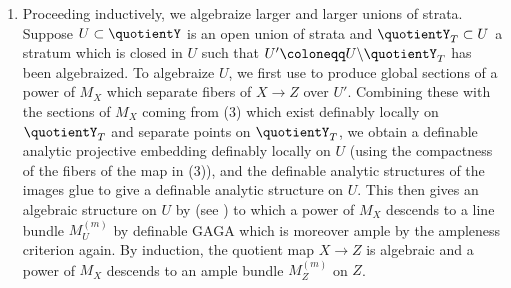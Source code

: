\documentclass{amsart}
\newcommand{\bs}{\backslash}
\theoremstyle{definition}
\theoremstyle{remark}
\def\bD{\mathbb{D}}
\def\bC{\mathbb{C}}
\def\bP{\mathbb{P}}
\def\fT{\mathfrak{T}}
\def\trans{\mathrm{tr}}
\def\mini{\mathrm{min}}
\def\fT{\mathfrak{T}}
\numberwithin{equation}{section}
\begin{document}
\begin{enumerate}[itemsep=.5em]
The full period map $\widetilde{X_\Sigma}^{E^\trans_\Sigma}\to\bD_\Sigma$ of $E^\trans_\Sigma$, where $\widetilde{X_\Sigma}^{E^\trans_\Sigma}$ is the minimal cover on which $E^\trans_\Sigma$ is trivialized, factors through some $\widetilde{\quotientY_T}$ but does not lift to $\widetilde{\fT_X(\Sigma)}^{E^\trans_\Sigma}$.  We show that the map $\widetilde{X_\Sigma}^{E^\mini_\Sigma}\to\bP(E_{\Sigma,\bC,x}^\mini)$ obtained by only remembering $M_X\subset E_\Sigma^\mini$ will: (i) have the same (connected components of) fibers along $\widetilde{X_\Sigma}^{E^\mini_\Sigma}$ as the period map $\widetilde{X_\Sigma}^{E^\trans_\Sigma}\to\bD_\Sigma$, and (ii) lift to $\widetilde{\fT_X(\Sigma)}^{E^\mini_\Sigma}$.  This construction provides the definable analytic ``Hodge-theoretic'' sections described above definably locally on $\quotientY$ and crucially uses the fact that we are working with a CY variation, which is why even in the case of  it is important to consider the auxiliary CY variation $E$.  It is also in this step that, in the case of , we use the integrability to ensure (i) and the torsion combinatorial monodromy condition to ensure that $\widetilde{X_\Sigma}^{E^\mini_\Sigma}\to\bP(E_{\Sigma,\bC,x}^\mini)$ has compact connected components of fibers.      

 

\item\label{step:induction} Proceeding inductively, we algebraize larger and larger unions of strata. Suppose $U\subset\quotientY$ is an open union of strata and $\quotientY_T\subset U$ a stratum which is closed in $U$ such that $U'\coloneqq  U\bs \quotientY_T$ has been algebraized. To algebraize $U$, we first use \cite[Theorem 5.4]{BBT23} to produce global sections of a power of $M_X$ which separate fibers of $X\to Z$ over $U'$.  Combining these with the sections of $M_X$ coming from (3) which exist definably locally on $\quotientY_T$ and separate points on $\quotientY_T$, we obtain a definable analytic projective embedding definably locally on $U$ (using the compactness of the fibers of the map in (3)), and the definable analytic structures of the images glue to give a definable analytic structure on $U$.  This then gives an algebraic structure on $U$ by \cite[Theorem 1.3]{BBT23} (see ) to which a power of $M_X$ descends to a line bundle $M_{U}^{(m)}$ by definable GAGA which is moreover ample by the ampleness criterion \cite[Theorem 5.4]{BBT23} again.  By induction, the quotient map $X\to Z$ is algebraic and a power of $M_X$ descends to an ample bundle $M_Z^{(m)}$ on $Z$. 


\end{enumerate}
\end{document}
